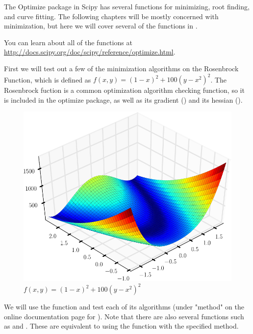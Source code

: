 \label{lab:Optimization1}

The Optimize package in Scipy has several functions for minimizing, root finding, and curve fitting. The following chapters will be mostly concerned with minimization, but here we will cover several of the functions in .

You can learn about all of the functions at \url{http://docs.scipy.org/doc/scipy/reference/optimize.html}.

First we will test out a few of the minimization algorithms on the Rosenbrock Function, which is defined as $f(x,y) = (1-x)^2 + 100(y-x^2)^2$.
The Rosenbrock fuction is a common optimization algorithm checking function, so it is included in the optimize package, as well as its gradient () and its hessian ().

\begin{figure}
\includegraphics[width=\textwidth]{Rosenbrock.pdf}
\caption{$f(x,y) = (1-x)^2 + 100(y-x^2)^2$}
\label{opt:rosenbrock}
\end{figure}

We will use the  function and test each of its algorithms (under "method" on the online documentation page for ). Note that there are also several functions such as  and . These are equivalent to using the  function with the specified method.

